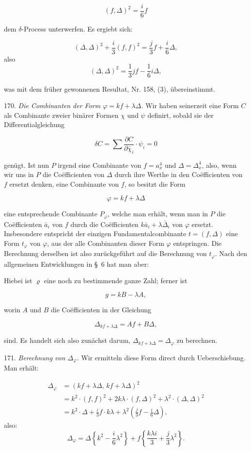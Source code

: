 \[
(f,\Delta)^2 = \frac{i}{6}f
\]

dem $\delta$-Process unterwerfen. Es ergiebt sich:

\[
(\Delta,\Delta)^2 + \frac{i}{3}(f,f)^2 = \frac{j}{3}f + \frac{i}{6}\Delta,
\]
also
\[
(\Delta,\Delta)^2 = \frac{1}{3}jf - \frac{1}{6}i\Delta,
\]

was mit dem früher gewonnenen Resultat, Nr. 158, (3), übereinstimmt.

170. \textit{Die Combinanten der Form $\varphi=kf+\lambda\Delta$.} Wir haben seinerzeit eine Form $C$ als Combinante zweier binärer Formen $\chi$ und $\psi$ definirt, sobald sie der Differentialgleichung

\[
\delta C = \sum \frac{\partial C}{\partial \bar\chi_i}\cdot \psi_i = 0
\]

genügt. Ist nun $P$ irgend eine Combinante von $f=a_x^4$ und $\Delta=\Delta_x^4$, also, wenn wir uns in $P$ die Co\"efficienten von $\Delta$ durch ihre Werthe in den Co\"efficienten von $f$ ersetzt denken, eine Combinante von $f$, so besitzt die Form

\[
\varphi = kf + \lambda\Delta
\]

eine entsprechende Combinante $P_\varphi$, welche man erhält, wenn man in $P$ die Co\"efficienten $\bar a_i$ von $f$ durch die Co\"efficienten $k\bar a_i+\lambda\bar\Delta_i$ von $\varphi$ ersetzt. Insbesondere entspricht der einzigen Fundamentalcombinante $t=(f,\Delta)$ eine Form $t_\varphi$ von $\varphi$, aus der alle Combinanten dieser Form $\varphi$ entspringen. Die Berechnung derselben ist also zurückgeführt auf die Berechnung von $t_\varphi$. Nach den allgemeinen Entwicklungen in \S~6 hat man aber:


Hiebei ist $\varrho$ eine noch zu bestimmende ganze Zahl; ferner ist

\[
g = kB - \lambda A,
\]

worin $A$ und $B$ die Co\"efficienten in der Gleichung

\[
\Delta_{kf+\lambda\Delta} = Af+B\Delta,
\]

sind. Es handelt sich also zunächst darum, $\Delta_{kf+\lambda\Delta}=\Delta_\varphi$ zu berechnen.

171. \textit{Berechnung von $\Delta_\varphi$.} Wir ermitteln diese Form direct durch Ueberschiebung. Man erhält:

\[
\begin{aligned}
\Delta_\varphi &= (kf+\lambda\Delta,\,kf+\lambda\Delta)^2\\
&= k^2\cdot(f,f)^2 + 2k\lambda\cdot(f,\Delta)^2 + \lambda^2\cdot(\Delta,\Delta)^2\\
&= k^2\cdot\Delta + \frac{i}{3}f\cdot k\lambda + \lambda^2\left(\frac{j}{3}f-\frac{i}{6}\Delta\right),
\end{aligned}
\]
also:
\[
\Delta_\varphi = \Delta\left\{k^2-\frac{i}{6}\lambda^2\right\} + f\left\{\frac{k\lambda i}{3}+\frac{j}{3}\lambda^2\right\}.
\]

